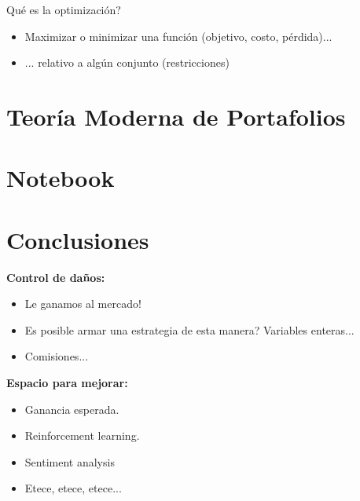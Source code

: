 \documentclass[12pt,aspectratio=169]{beamer}
\begin{document}
\begin{frame}{Qué es la optimización?}
\begin{itemize}
\item Maximizar o minimizar una función (objetivo, costo, pérdida)...
\item ... relativo a algún conjunto (restricciones)

\end{itemize}


\begin{center}
\end{center}

\end{frame}

\section{Teoría Moderna de Portafolios}

\section{Notebook}

\section{Conclusiones}
\begin{frame}
\textbf{Control de daños:}

\begin{itemize}
\item Le ganamos al mercado!
\item Es posible armar una estrategia de esta manera? Variables enteras...
\item Comisiones...
\end{itemize}

\textbf{Espacio para mejorar:}

\begin{itemize}
\item Ganancia esperada.
\item Reinforcement learning.
\item Sentiment analysis
\item Etece, etece, etece...
\end{itemize}
\end{frame}
\end{document}
